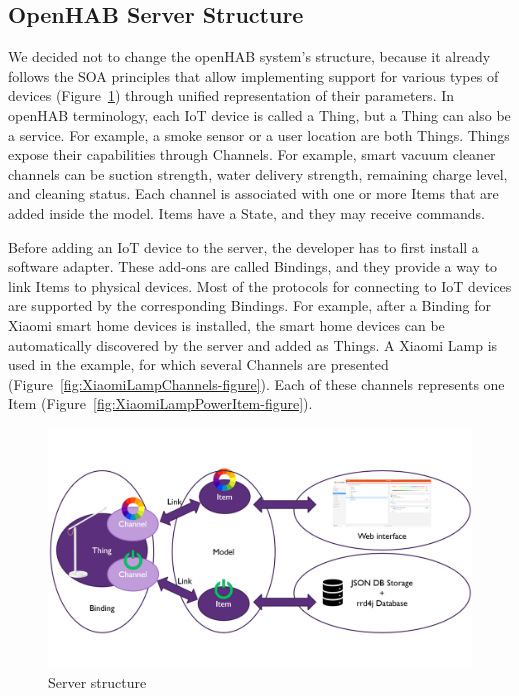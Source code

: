 \subsection{OpenHAB Server Structure}

We decided not to change the openHAB system's structure, because it already follows the SOA principles that allow implementing support for various types of devices (Figure~\ref{fig:openHABServerStructure-figure}) through unified representation of their parameters. In openHAB terminology, each IoT device is called a Thing, but a Thing can also be a service. For example, a smoke sensor or a user location are both Things. Things expose their capabilities through Channels. For example, smart vacuum cleaner channels can be suction strength, water delivery strength, remaining charge level, and cleaning status. Each channel is associated with one or more Items that are added inside the model. Items have a State, and they may receive commands. 

Before adding an IoT device to the server, the developer has to first install a software adapter. These add-ons are called Bindings, and they provide a way to link Items to physical devices. Most of the protocols for connecting to IoT devices are supported by the corresponding Bindings. For example, after a Binding for Xiaomi smart home devices is installed, the smart home devices can be automatically discovered by the server and added as Things. A Xiaomi Lamp is used in the example, for which several Channels are presented (Figure~\ref{fig:XiaomiLampChannels-figure}). Each of these channels represents one Item (Figure~\ref{fig:XiaomiLampPowerItem-figure}).

\begin{figure}
  \centering
  \includegraphics[width=0.9\linewidth]{figures/openHABServerStructure.png}
  \caption{Server structure}
  \label{fig:openHABServerStructure-figure}
\end{figure}

